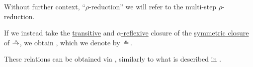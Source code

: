 \begin{definition}
\begin{thmenum}
    Without further context, \enquote{\( \rho \)-reduction} we will refer to the multi-step \( \rho \)-reduction.

     If we instead take the
    \hyperref[def:relation_closures/transitive]{transitive} and \hyperref[def:alpha_reflexive_closure]{\( \alpha \)-reflexive} closure of the \hyperref[def:relation_closures/symmetric]{symmetric closure} of \( \redrel{\rho} \), we obtain , which we denote by \( {\equivrel{\rho}} \).
  \end{thmenum}
\end{definition}
\begin{comments}
  \item These relations can be obtained via , similarly to what is described in .
\end{comments}


